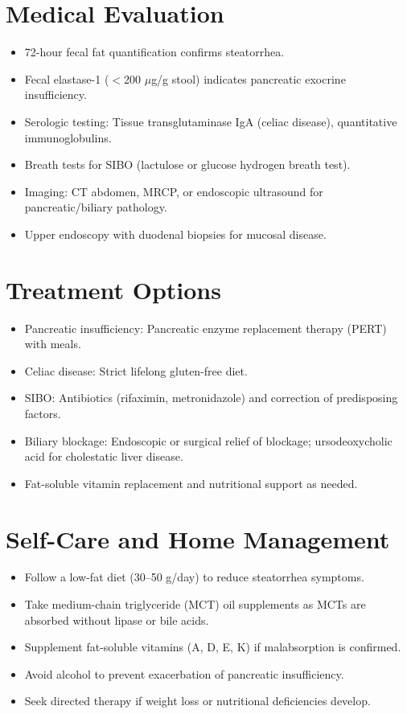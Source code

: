 \section*{Medical Evaluation}
\begin{itemize}
  \item 72-hour fecal fat quantification confirms steatorrhea.
  \item Fecal elastase-1 ($<$200 $\mu$g/g stool) indicates pancreatic exocrine insufficiency.
  \item Serologic testing: Tissue transglutaminase IgA (celiac disease), quantitative immunoglobulins.
  \item Breath tests for SIBO (lactulose or glucose hydrogen breath test).
  \item Imaging: CT abdomen, MRCP, or endoscopic ultrasound for pancreatic/biliary pathology.
  \item Upper endoscopy with duodenal biopsies for mucosal disease.
\end{itemize}

\section*{Treatment Options}
\begin{itemize}
  \item Pancreatic insufficiency: Pancreatic enzyme replacement therapy (PERT) with meals.
  \item Celiac disease: Strict lifelong gluten-free diet.
  \item SIBO: Antibiotics (rifaximin, metronidazole) and correction of predisposing factors.
  \item Biliary blockage: Endoscopic or surgical relief of blockage; ursodeoxycholic acid for cholestatic liver disease.
  \item Fat-soluble vitamin replacement and nutritional support as needed.
\end{itemize}

\section*{Self-Care and Home Management}
\begin{itemize}
  \item Follow a low-fat diet (30--50 g/day) to reduce steatorrhea symptoms.
  \item Take medium-chain triglyceride (MCT) oil supplements as MCTs are absorbed without lipase or bile acids.
  \item Supplement fat-soluble vitamins (A, D, E, K) if malabsorption is confirmed.
  \item Avoid alcohol to prevent exacerbation of pancreatic insufficiency.
  \item Seek directed therapy if weight loss or nutritional deficiencies develop.
\end{itemize}

